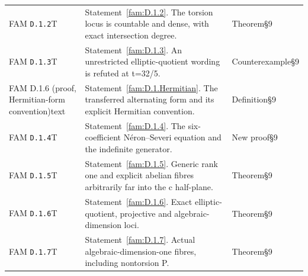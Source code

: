 \documentclass[11pt,a4paper]{article}
\theoremstyle{plain}
\theoremstyle{definition}
\begin{document}
\begin{longtable}{@{}L{.18\linewidth}L{.48\linewidth}L{.29\linewidth}@{}}
FAM \nolinkurl{D.1.2}\newline T & Statement~\ref{fam:D.1.2}. The torsion locus is countable and dense, with exact intersection degree.\newline {} & Theorem\newline §9\\
FAM \nolinkurl{D.1.3}\newline T & Statement~\ref{fam:D.1.3}. An unrestricted elliptic-quotient wording is refuted at t=32/\allowbreak{}5.\newline {} & Counterexample\newline §9\\
FAM D.1.6 (proof, Hermitian-form convention)\newline text & Statement~\ref{fam:D.1.Hermitian}. The transferred alternating form and its explicit Hermitian convention.\newline {} & Definition\newline §9\\
FAM \nolinkurl{D.1.4}\newline T & Statement~\ref{fam:D.1.4}. The six-coefficient Néron--Severi equation and the indefinite generator.\newline {} & New proof\newline §9\\
FAM \nolinkurl{D.1.5}\newline T & Statement~\ref{fam:D.1.5}. Generic rank one and explicit abelian fibres arbitrarily far into the c half-plane.\newline {} & Theorem\newline §9\\
FAM \nolinkurl{D.1.6}\newline T & Statement~\ref{fam:D.1.6}. Exact elliptic-quotient, projective and algebraic-dimension loci.\newline {} & Theorem\newline §9\\
FAM \nolinkurl{D.1.7}\newline T & Statement~\ref{fam:D.1.7}. Actual algebraic-dimension-one fibres, including nontorsion P.\newline {} & Theorem\newline §9\\

\end{longtable}
\end{document}
